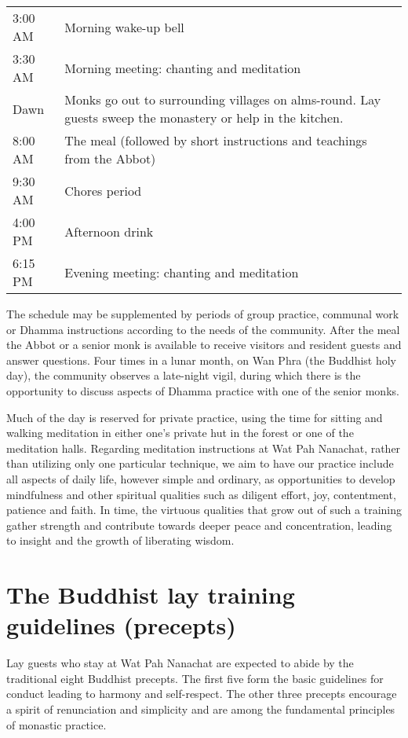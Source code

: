 \begin{tabular}{l p{80mm}}
3:00 AM & Morning wake-up bell\\
3:30 AM & Morning meeting: chanting and meditation\\
Dawn & Monks go out to surrounding villages on alms-round. Lay guests sweep the monastery or help in the kitchen.\\
8:00 AM & The meal (followed by short instructions and teachings from the Abbot)\\
9:30 AM & Chores period\\
4:00 PM & Afternoon drink\\
6:15 PM & Evening meeting: chanting and meditation\\
\end{tabular}

The schedule may be supplemented by periods of group practice, communal
work or Dhamma instructions according to the needs of the community.
After the meal the Abbot or a senior monk is available to receive
visitors and resident guests and answer questions. Four times in a lunar
month, on Wan Phra (the Buddhist holy day), the community observes a
late-night vigil, during which there is the opportunity to discuss
aspects of Dhamma practice with one of the senior monks.

Much of the day is reserved for private practice, using the time for
sitting and walking meditation in either one's private hut in the forest
or one of the meditation halls. Regarding meditation instructions at Wat
Pah Nanachat, rather than utilizing only one particular technique, we
aim to have our practice include all aspects of daily life, however
simple and ordinary, as opportunities to develop mindfulness and other
spiritual qualities such as diligent effort, joy, contentment, patience
and faith. In time, the virtuous qualities that grow out of such a
training gather strength and contribute towards deeper peace and
concentration, leading to insight and the growth of liberating
wisdom.

\section{The Buddhist lay training guidelines (precepts)}

Lay guests who stay at Wat Pah Nanachat are expected to abide by the
traditional eight Buddhist precepts. The first five form the basic
guidelines for conduct leading to harmony and self-respect. The other
three precepts encourage a spirit of renunciation and simplicity and are
among the fundamental principles of monastic practice.

